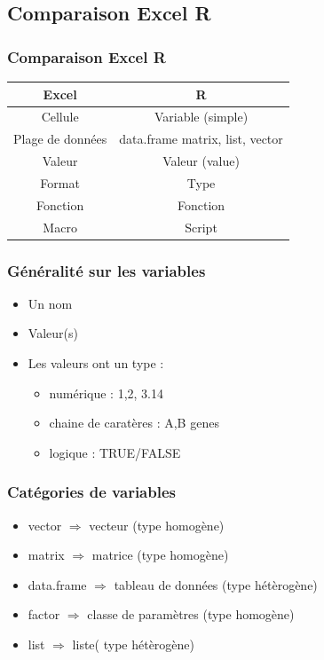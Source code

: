 \documentclass{beamer}
\begin{document}
\subsection{Comparaison Excel R}
\begin{frame}
	\frametitle{Comparaison Excel R}
	\begin{center}
		\setlength\doublerulesep{3pt}
	\begin{tabular}[h]{|c||c|}
		\hline
		Excel & R \\
		\hline \hline
		\rowcolor{green!25}
		Cellule & Variable (simple) \\
		\hline
		\rowcolor{green!25}
		Plage de données & data.frame matrix, list, vector \\
		\hline
		\rowcolor{green!15}
		Valeur & Valeur (value) \\
		\hline
		\rowcolor{green!15}
		Format & Type \\
		\hline
		\rowcolor{blue!25}
		Fonction & Fonction \\
		\hline
		\rowcolor{red!25}
		Macro & Script \\
		\hline
	\end{tabular}
	\end{center}
\end{frame}

\begin{frame}
	\frametitle{Généralité sur les variables}
	\begin{itemize}
		\item Un nom
		\item Valeur(s)
		\item Les valeurs ont un type : 
			\begin{itemize}
				\item numérique : 1,2, 3.14
				\item chaine de caratères : A,B genes
				\item logique : TRUE/FALSE
			\end{itemize}
	\end{itemize}
\end{frame}

\begin{frame}
	\frametitle{Catégories de variables}
		\begin{itemize}[<+->]
			\item vector $\Rightarrow$ vecteur (type homogène)
			\item matrix $\Rightarrow$ matrice (type homogène)
			\item data.frame $\Rightarrow$ tableau de données (type hétèrogène)
			\item factor $\Rightarrow$ classe de paramètres (type homogène)
			\item list $\Rightarrow$ liste( type hétèrogène)
		\end{itemize}
\end{frame}
\end{document}
